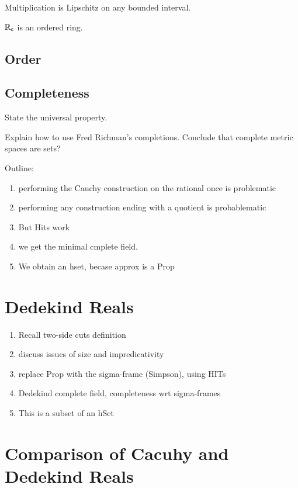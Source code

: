 Multiplication is Lipschitz on any bounded interval.

\begin{thm}
  $\mathbb{R}_\mathsf{c}$ is an ordered ring.
\end{thm}

\subsection{Order}
\label{sec:order}

\subsection{Completeness}
\label{sec:completeness}

State the universal property.

Explain how to use Fred Richman's completions. Conclude that complete metric spaces are sets?




\hrulefill

Outline:
\begin{enumerate}
  \item performing the Cauchy construction on the rational once is problematic
  \item performing any construction ending with a quotient is probablematic
  \item But Hits work
  \item we get the minimal cmplete field.
  \item We obtain an hset, becase approx is a Prop
\end{enumerate}

\section{Dedekind Reals}
\label{sec:dedekind-reals}

\begin{enumerate}
\item Recall two-side cuts definition
\item discuss issues of size and impredicativity
\item replace Prop with the sigma-frame (Simpson), using HITs
\item Dedekind complete field, completeness wrt sigma-frames
\item This is a subset of an hSet
\end{enumerate}

\section{Comparison of Cacuhy and Dedekind Reals}
\label{sec:comp-cacuhy-dedek}

